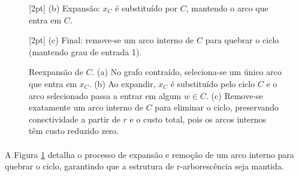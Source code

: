\documentclass[12pt,a4paper]{article}
\def\\{}%
\def\times{\string x}%
\begin{document}
\begin{figure}[htbp]
\begin{minipage}{.31\textwidth}
        \\[2pt]
        \small (b) Expansão: $x_C$ é substituído por $C$, mantendo o arco que entra em $C$.
    \end{minipage}\hfill
    \begin{minipage}{.31\textwidth}
        \centering
        \\[2pt]
        \small (c) Final: remove-se um arco interno de $C$ para quebrar o ciclo (mantendo grau de entrada 1).
    \end{minipage}
    \caption{Reexpansão de $C$. (a) No grafo contraído, seleciona-se um único arco que entra em $x_C$. (b) Ao expandir, $x_C$ é substituído pelo ciclo $C$ e o arco selecionado passa a entrar em algum $w\in C$. (c) Remove-se exatamente um arco interno de $C$ para eliminar o ciclo, preservando conectividade a partir de $r$ e o custo total, pois os arcos internos têm custo reduzido zero.}
    \label{fig:chu-liu-reexpansion}
\end{figure}

\paragraph{}
A Figura \ref{fig:chu-liu-reexpansion} detalha o processo de expansão e remoção de um arco interno para quebrar o ciclo, garantindo que a estrutura de r-arborescência seja mantida.
\end{document}
